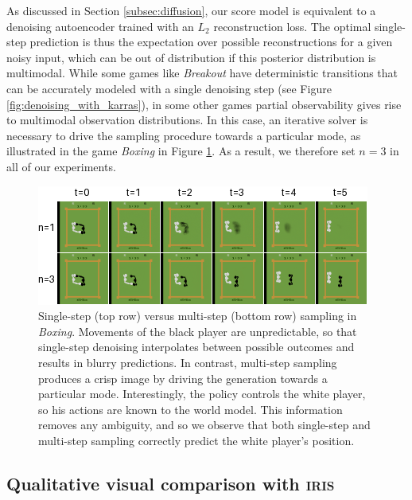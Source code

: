 As discussed in Section \ref{subsec:diffusion}, our score model is equivalent to a denoising autoencoder \citep{vincent2008extracting} trained with an $L_2$ reconstruction loss. The optimal single-step prediction is thus the expectation over possible reconstructions for a given noisy input, which can be out of distribution if this posterior distribution is multimodal. While some games like \textit{Breakout} have deterministic transitions that can be accurately modeled with a single denoising step (see Figure \ref{fig:denoising_with_karras}), in some other games partial observability gives rise to multimodal observation distributions. In this case, an iterative solver is necessary to drive the sampling procedure towards a particular mode, as illustrated in the game \textit{Boxing} in Figure \ref{fig:too_optimisitic_4_sure}. As a result, we therefore set $n=3$ in all of our experiments.
\vspace{-2mm}
\begin{figure}[h!]
\begin{center}
\includegraphics[width=.64\linewidth]{images/figure__blurry_boxing.png}
\caption{Single-step (top row) versus multi-step (bottom row) sampling in \textit{Boxing}. Movements of the black player are unpredictable, so that single-step denoising interpolates between possible outcomes and results in blurry predictions. In contrast, multi-step sampling produces a crisp image by driving the generation towards a particular mode. Interestingly, the policy controls the white player, so his actions are known to the world model. This information removes any ambiguity, and so we observe that both single-step and multi-step sampling correctly predict the white player's position.}
\label{fig:too_optimisitic_4_sure}
\end{center}
\vspace{-4mm}
\end{figure}


\subsection{Qualitative visual comparison with \textsc{iris}}
\label{subsec:comparison_transformers}

